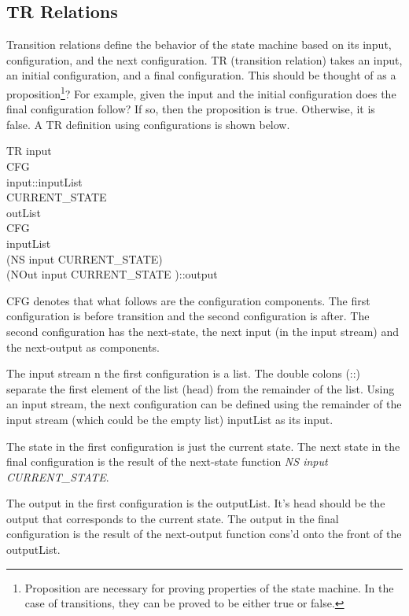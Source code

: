 \documentclass[../../main/main.tex]{subfiles}
\begin{document}
\subsection{TR Relations}
Transition relations define the behavior of the state machine based on its input, configuration, and the next configuration.  TR (transition relation) takes an input, an initial configuration, and a final configuration.  This should be thought of as a proposition\footnote{Proposition are necessary for proving properties of the state machine.  In the case of transitions, they can be proved to be either true or false.}?  For example, given the input and the initial configuration does the final configuration follow?  If so, then the proposition is true.  Otherwise, it is false.  A TR definition using configurations is shown below.

TR input\\
CFG \\
\hspace{1cm}input::inputList\\
\hspace{1cm}CURRENT_STATE\\
\hspace{1cm}outList\\
CFG\\
\hspace{1cm}inputList\\
\hspace{1cm}(NS input CURRENT_STATE)\\
\hspace{1cm}(NOut input CURRENT_STATE )::output


CFG denotes that what follows are the configuration components.  The first configuration is before transition and the second configuration is after.  The second configuration has the next-state, the next input (in the input stream) and the next-output as components.  

The input stream n the first configuration is a list. The double colons (::) separate the first element of the list (head) from the remainder of the list.  Using an input stream, the next configuration can be defined using the remainder of the input stream (which could be the empty list) inputList as its input. 

The state in the first configuration is just the current state.  The next state in the final configuration is the result of the next-state function \textit{NS input CURRENT_STATE}.

The output in the first configuration is the outputList.  It's head should be the output that corresponds to the current state.  The output in the final configuration is the result of the next-output function cons'd onto the front of the outputList.
\end{document}
